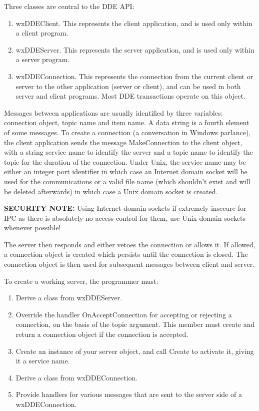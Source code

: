 Three classes are central to the DDE API:

\begin{enumerate}\itemsep=0pt
\item wxDDEClient. This represents the client application, and is used
only within a client program.
\item wxDDEServer. This represents the server application, and is used
only within a server program.
\item wxDDEConnection. This represents the connection from the current
client or server to the other application (server or client), and can be used
in both server and client programs. Most DDE
transactions operate on this object.
\end{enumerate}

Messages between applications are usually identified by three variables:
connection object, topic name and item name.  A data string is a fourth
element of some messages. To create a connection (a conversation in
Windows parlance), the client application sends the message
MakeConnection to the client object, with a string service name to
identify the server and a topic name to identify the topic for the
duration of the connection. Under Unix, the service name may be either an
integer port identifier in which case an Internet domain socket will be used
for the communications or a valid file name (which shouldn't exist and will be
deleted afterwards) in which case a Unix domain socket is created.

{\bf SECURITY NOTE:} Using Internet domain sockets if extremely insecure for
IPC as there is absolutely no access control for them, use Unix domain sockets
whenever possible!

The server then responds and either vetoes the connection or allows it.
If allowed, a connection object is created which persists until the
connection is closed.  The connection object is then used for subsequent
messages between client and server.

To create a working server, the programmer must:

\begin{enumerate}\itemsep=0pt
\item Derive a class from wxDDEServer.
\item Override the handler OnAcceptConnection for accepting or rejecting a connection,
on the basis of the topic argument. This member must create and return a connection
object if the connection is accepted.
\item Create an instance of your server object, and call Create to
activate it, giving it a service name.
\item Derive a class from wxDDEConnection.
\item Provide handlers for various messages that are sent to the server
side of a wxDDEConnection.
\end{enumerate}

